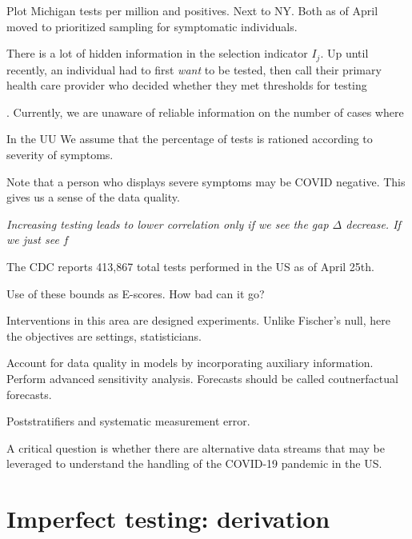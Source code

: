 \documentclass[11pt]{amsart}
\begin{document}
Plot Michigan tests per million and positives.  Next to NY.  Both as of April moved to prioritized sampling for symptomatic individuals.

There is a lot of hidden information in the selection indicator $I_j$.  Up until recently, an individual had to first \emph{want} to be tested, then call their primary health care provider who decided whether they met thresholds for testing

. Currently, we are unaware of reliable information on the number of cases where

In the UU
We assume that the percentage of tests is rationed according to severity of symptoms.

Note that a person who displays severe symptoms may be COVID negative.  This gives us a sense of the data quality.

\emph{Increasing testing leads to lower correlation only if we see the gap $\Delta$ decrease.  If we just see $f$ }

The CDC reports 413,867 total tests performed in the US as of April 25th.




Use of these bounds as E-scores.  How bad can it go?

Interventions in this area are designed experiments.  Unlike Fischer's null, here the objectives are settings, statisticians.

Account for data quality in models by incorporating auxiliary information.  Perform advanced sensitivity analysis.  Forecasts should be called coutnerfactual forecasts.

Poststratifiers and systematic measurement error.

A critical question is whether there are alternative data streams that may be leveraged to understand the handling of the COVID-19 pandemic in the US.

\appendix

\section{Imperfect testing: derivation}
\end{document}
